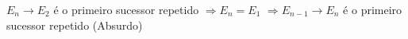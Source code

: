 \documentclass[preview]{standalone}
\begin{document}
\begin{center}
$E_n \rightarrow E_2$ é o primeiro sucessor repetido $\Rightarrow E_n = E_1$
      $\Rightarrow E_{n-1} \rightarrow E_n$ é o primeiro sucessor repetido (Absurdo)
\end{center}
\end{document}

